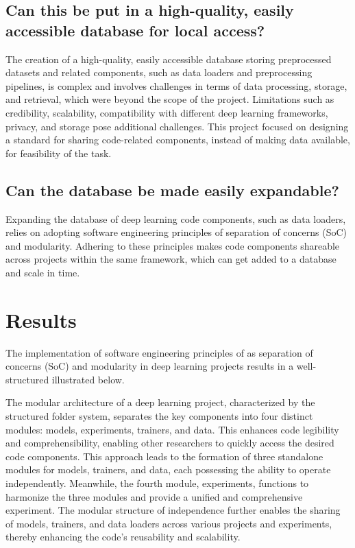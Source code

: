 \documentclass{article}
\begin{document}
\subsection{Can this be put in a high-quality, easily accessible database for local access?} {
The creation of a high-quality, easily accessible database storing preprocessed datasets and related components, such as data loaders and preprocessing pipelines, is complex and involves challenges in terms of data processing, storage, and retrieval, which were beyond the scope of the project. Limitations such as credibility, scalability, compatibility with different deep learning frameworks, privacy, and storage pose additional challenges. This project focused on designing a standard for sharing code-related components, instead of making data available, for feasibility of the task.
}

\subsection{Can the database be made easily expandable?} {
Expanding the database of deep learning code components, such as data loaders, relies on adopting software engineering principles of separation of concerns (SoC) and modularity. Adhering to these principles makes code components shareable across projects within the same framework, which can get added to a database and scale in time.
}

\section{Results}



The implementation of software engineering principles of as separation of concerns (SoC) and modularity in deep learning projects results in a well-structured illustrated below. 
\vspace{0.7em}


The modular architecture of a deep learning project, characterized by the structured folder system, separates the key components into four distinct modules: models, experiments, trainers, and data. This enhances code legibility and comprehensibility, enabling other researchers to quickly access the desired code components. This approach leads to the formation of three standalone modules for models, trainers, and data, each possessing the ability to operate independently. Meanwhile, the fourth module, experiments, functions to harmonize the three modules and provide a unified and comprehensive experiment. The modular structure of independence further enables the sharing of models, trainers, and data loaders across various projects and experiments, thereby enhancing the code's reusability and scalability. 
\end{document}
